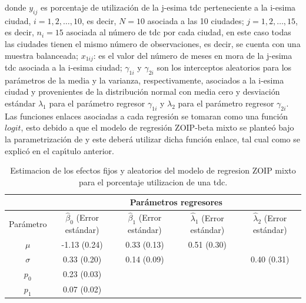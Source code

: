donde $y_{ij}$ es porcentaje de utilizaci\'{o}n de la j-esima tdc perteneciente a la i-esima ciudad, $i=1,2,\ldots, 10$, es decir, $N=10$ asociada a las 10 ciudades; $j=1,2,\ldots, 15$, es decir, $n_i=15$ asociada al n\'{u}mero de tdc por cada ciudad, en este caso todas las ciudades tienen el mismo n\'{u}mero de observaciones, es decir, se cuenta con una muestra balanceada;  $x_{1ij}$: es el valor del n\'{u}mero de meses en mora de la j-esima tdc asociada a la i-esima ciudad; $\gamma_{1i}$ y $\gamma_{2i}$ son los interceptos aleatorios para los par\'{a}metros de la media y la varianza, respectivamente, asociados a la i-esima ciudad y provenientes de la distribuci\'{o}n normal con media cero y desviaci\'{o}n est\'{a}ndar $\lambda_1$ para el par\'{a}metro regresor $\gamma_{1i}$ y $\lambda_2$ para el par\'{a}metro regresor $\gamma_{2i}$. Las funciones enlaces asociadas a cada regresi\'{o}n se tomaran como una funci\'{o}n $logit$, esto debido a que el modelo de regresi\'{o}n ZOIP-beta mixto se plante\'{o} bajo la parametrizaci\'{o}n de \cite{Stasinopoulos2} y este deber\'{a} utilizar dicha funci\'{o}n enlace, tal cual como se explic\'{o} en el cap\'{\i}tulo anterior.\\


\begin{table}[!hbt]
{\scriptsize
\begin{center}
\begin{tabular}{|c|c|c|c|c|}\hline
& \multicolumn{4}{|c|}{Par\'{a}metros regresores} \\ \hline
Par\'{a}metro & $\hat{\beta}_0$ (Error est\'{a}ndar)&  $\hat{\beta}_1$ (Error est\'{a}ndar) & $\hat{\lambda}_1$ (Error est\'{a}ndar)& $\hat{\lambda}_2$ (Error est\'{a}ndar) \\ \hline
$\mu$ & -1.13 (0.24)	&0.33	(0.13)&0.51 (0.30)& \\ \hline
$\sigma$ & 0.33	(0.20)&0.14	(0.09)&	&0.40 (0.31) \\ \hline
$p_0$ & 0.23 (0.03)& & & \\ \hline
$p_1$ & 0.07 (0.02)& & & \\ \hline
\end{tabular}
\caption{Estimacion de los efectos fijos y aleatorios del modelo de regresion ZOIP mixto para el porcentaje utilizacion de una tdc.}
\label{T_Apli_mix}
\end{center}
}
\end{table}

